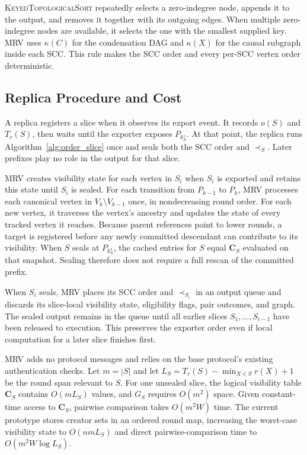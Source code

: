 \textsc{KeyedTopologicalSort} repeatedly selects a zero-indegree node, appends it to the output, and removes it together with its outgoing edges. When multiple zero-indegree nodes are available, it selects the one with the smallest supplied key. MRV uses $\kappa(C)$ for the condensation DAG and $\kappa(X)$ for the causal subgraph inside each SCC. This rule makes the SCC order and every per-SCC vertex order deterministic.

\subsection{Replica Procedure and Cost}
\label{sec:replica_procedure}

A replica registers a slice when it observes its export event. It records $o(S)$ and $T_r(S)$, then waits until the exporter exposes
$P_{k^\star_S}$. At that point, the replica runs Algorithm~\ref{alg:order_slice} once and seals both the SCC order and $\prec_S$. Later prefixes play no role in the output for that slice.


MRV creates visibility state for each vertex in $S_i$ when $S_i$ is exported and retains this state until $S_i$ is sealed. For each transition from $P_{k-1}$ to $P_k$, MRV processes each canonical vertex in $V_k\setminus V_{k-1}$ once, in nondecreasing round order. For each new vertex, it traverses the vertex's ancestry and updates the state of every tracked vertex it reaches. Because parent references point to lower rounds, a target is registered before any newly committed descendant can contribute to its visibility. When $S$ seals at $P_{k^\star_S}$, the cached entries for $S$ equal $\mathbf{C}_S$ evaluated on that snapshot. Sealing therefore does not require a full rescan of the committed prefix.

When $S_i$ seals, MRV places its SCC order and $\prec_{S_i}$ in an output queue and discards its slice-local visibility state, eligibility flags, pair outcomes, and graph. The sealed output remains in the queue until all earlier slices $S_1,\ldots,S_{i-1}$ have been released to execution. This preserves the exporter order even if local computation for a later slice finishes first.

MRV adds no protocol messages and relies on the base protocol's existing authentication checks. Let $m=|S|$ and let $L_S=T_r(S)-\min_{X\in S}r(X)+1$ be the round span relevant to $S$. For one
unsealed slice, the logical visibility table $\mathbf{C}_S$ contains $O(mL_S)$ values, and $G_S$ requires $O(m^2)$ space. Given constant-time access to $\mathbf{C}_S$, pairwise comparison takes $O(m^2W)$ time. The current prototype stores creator sets in an ordered round map, increasing the worst-case visibility state to $O(nmL_S)$ and direct pairwise-comparison time to $O(m^2W\log L_S)$.

